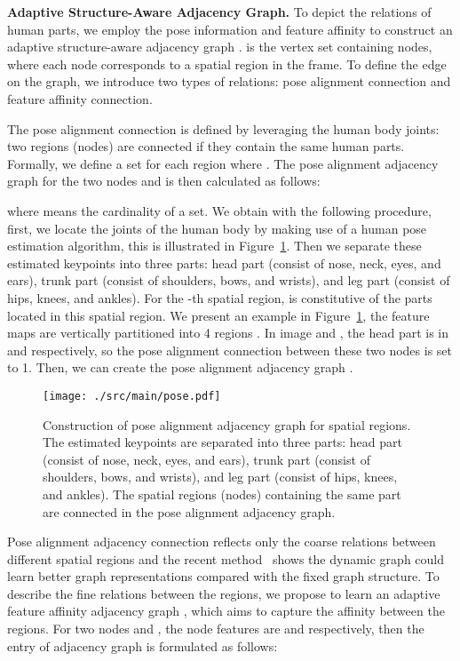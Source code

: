 \documentclass[journal]{IEEEtran}
\let\MYoriglatexcaption\caption
\renewcommand{\caption}[2][\relax]{\MYoriglatexcaption[#2]{#2}}
\begin{document}
\noindent\textbf{Adaptive Structure-Aware Adjacency Graph.}
To depict the relations of human parts, we employ the pose information and feature affinity to construct an adaptive structure-aware adjacency graph .  is the vertex set containing  nodes, where each node  corresponds to a spatial region in the frame. To define the edge  on the graph, we introduce two types of relations: pose alignment connection and feature affinity connection.

The pose alignment connection is defined by leveraging the human body joints: two regions (nodes) are connected if they contain the same human parts. Formally, we define a set  for each region  where . The pose alignment adjacency graph  for the two nodes  and  is then calculated as follows:

where  means the cardinality of a set. We obtain  with the following procedure, first, we locate the joints of the human body by making use of a human pose estimation algorithm, this is illustrated in Figure~\ref{fig:pose}. Then we separate these estimated keypoints into three parts: head part (consist of nose, neck, eyes, and ears), trunk part (consist of shoulders, bows, and wrists), and leg part (consist of hips, knees, and ankles). For the -th spatial region,  is constitutive of the parts located in this spatial region. We present an example in Figure~\ref{fig:pose}, the feature maps are vertically partitioned into 4 regions . In image  and , the head part is in  and  respectively, so the pose alignment connection between these two nodes is set to 1. Then, we can create the pose alignment adjacency graph .
\begin{figure}[t]
    \centering
    \texttt{[image: ./src/main/pose.pdf]}
   \caption{Construction of pose alignment adjacency graph for spatial regions. The estimated keypoints are separated into three parts: head part (consist of nose, neck, eyes, and ears), trunk part (consist of shoulders, bows, and wrists), and leg part (consist of hips, knees, and ankles). The spatial regions (nodes) containing the same part are connected in the pose alignment adjacency graph.}
\label{fig:pose}
\end{figure}

Pose alignment adjacency connection reflects only the coarse relations between different spatial regions and the recent method~\cite{Simonovsky_2017_CVPR} shows the dynamic graph could learn better graph representations compared with the fixed graph structure. To describe the fine relations between the regions, we propose to learn an adaptive feature affinity adjacency graph , which aims to capture the affinity between the regions. For two nodes  and , the node features are  and  respectively, then the entry of adjacency graph  is formulated as follows:
\end{document}
